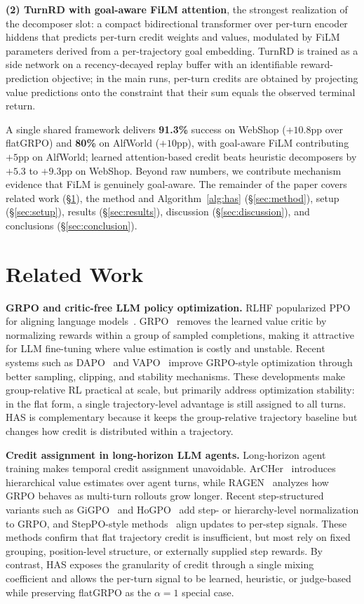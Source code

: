 \documentclass{article}
\begin{document}
\textbf{(2) TurnRD with goal-aware FiLM attention}, the strongest realization of the
decomposer slot: a compact bidirectional transformer over per-turn encoder hiddens that
predicts per-turn credit weights and values, modulated by FiLM~\citep{perez2018film}
parameters derived from a per-trajectory goal embedding. TurnRD is trained as a side
network on a recency-decayed replay buffer with an identifiable reward-prediction objective;
in the main runs, per-turn credits are obtained by projecting value predictions onto the
constraint that their sum equals the observed terminal return.

A single shared framework delivers \textbf{91.3\%} success on WebShop ($+10.8$pp over
flatGRPO) and \textbf{80\%} on AlfWorld ($+10$pp), with goal-aware FiLM contributing $+5$pp
on AlfWorld; learned attention-based credit beats heuristic decomposers by $+5.3$ to
$+9.3$pp on WebShop. Beyond raw numbers, we contribute mechanism evidence that FiLM is genuinely
goal-aware. The remainder of the paper covers related work (\S\ref{sec:related}), the method
and Algorithm~\ref{alg:has} (\S\ref{sec:method}), setup (\S\ref{sec:setup}), results
(\S\ref{sec:results}), discussion (\S\ref{sec:discussion}), and conclusions
(\S\ref{sec:conclusion}).

\section{Related Work}
\label{sec:related}
\textbf{GRPO and critic-free LLM policy optimization.} RLHF popularized PPO~\citep{schulman2017ppo}
for aligning language models~\citep{rlhf}. GRPO~\citep{shao2024deepseekmath,guo2025deepseekr1}
removes the learned value critic by normalizing rewards within a group of sampled completions,
making it attractive for LLM fine-tuning where value estimation is costly and unstable. Recent
systems such as DAPO~\citep{yu2025dapo} and VAPO~\citep{yue2025vapo} improve GRPO-style
optimization through better sampling, clipping, and stability mechanisms. These developments
make group-relative RL practical at scale, but primarily address optimization stability: in the
flat form, a single trajectory-level advantage is still assigned to all turns. HAS is
complementary because it keeps the group-relative trajectory baseline but changes how credit is
distributed within a trajectory.

\textbf{Credit assignment in long-horizon LLM agents.} Long-horizon agent training makes
temporal credit assignment unavoidable. ArCHer~\citep{zhou2024archer} introduces hierarchical
value estimates over agent turns, while RAGEN~\citep{wang2025ragen} analyzes how GRPO behaves
as multi-turn rollouts grow longer. Recent step-structured variants such as
GiGPO~\citep{feng2025gigpo} and HoGPO~\citep{he2026hogpo} add step- or hierarchy-level
normalization to GRPO, and StepPO-style methods~\citep{wang2026steppo} align updates to
per-step signals. These methods confirm that flat trajectory credit is insufficient, but most
rely on fixed grouping, position-level structure, or externally supplied step rewards. By
contrast, HAS exposes the granularity of credit through a single mixing coefficient and allows
the per-turn signal to be learned, heuristic, or judge-based while preserving flatGRPO as the
$\alpha{=}1$ special case.
\end{document}
